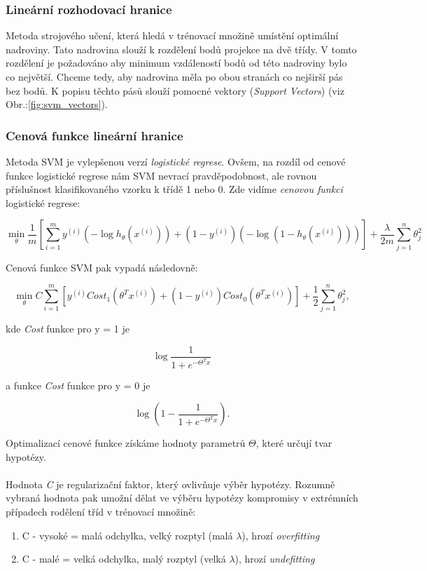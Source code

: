 \documentclass[a4]{article}
\begin{document}
\subsubsection{Lineární rozhodovací hranice}
Metoda strojového učení, která hledá v trénovací množině umístění optimální nadroviny. Tato nadrovina slouží k rozdělení bodů projekce na dvě třídy. V tomto rozdělení je požadováno aby minimum vzdáleností bodů od této nadroviny bylo co největší. Chceme tedy, aby nadrovina měla po obou stranách co nejširší pás bez bodů. K popisu těchto pásů slouží pomocné vektory (\textit{Support Vectors}) (viz Obr.:\ref{fig:svm_vectors}).
\cite{svm_zcu}

\subsubsection{Cenová funkce lineární hranice}
Metoda SVM je vylepšenou verzí \textit{logistické regrese}. Ovšem, na rozdíl od cenové funkce logistické regrese nám SVM nevrací pravděpodobnost, ale rovnou příslušnost klasifikovaného vzorku k třídě 1 nebo 0. Zde vidíme \textit{cenovou funkci} logistické regrese:

$$\min_{\theta} \frac{1}{m}[\sum_{i=1}^{m}y^{(i)}(-\log h_{\theta}(x^{(i)}))+(1-y^{(i)})(-\log(1-h_{\theta}(x^{(i)})))]+\frac{\lambda}{2m}\sum_{j=1}^{n}\theta_{j}^{2}$$

Cenová funkce SVM pak vypadá následovně:

$$\min_{\theta} C \sum_{i=1}^{m}[y^{(i)} Cost_1 (\theta^T x^{(i)})+(1-y^{(i)}) Cost_0 (\theta^T x^{(i)})] + \frac{1}{2} \sum_{j=1}^{n}\theta_{j}^{2},$$

kde \textit{Cost} funkce pro y = 1 je

$$\log\frac{1}{1 + e^{-\Theta^{T}x}}$$

a funkce \textit{Cost} funkce pro y = 0 je

$$\log(1-\frac{1}{1 + e^{-\Theta^{T}x}}).$$

Optimalizací cenové funkce získáme hodnoty parametrů $\Theta$, které určují tvar hypotézy.
\\\\
Hodnota \textit{C} je regularizační faktor, který ovlivňuje výběr hypotézy. Rozumně vybraná hodnota pak umožní dělat ve výběru hypotézy kompromisy v extrémních případech rodělení tříd v trénovací množině:

\begin{enumerate}
	\item C - vysoké = malá odchylka, velký rozptyl (malá $\lambda$), hrozí \textit{overfitting}
	\item C - malé = velká odchylka, malý rozptyl (velká $\lambda$), hrozí \textit{undefitting}
\end{enumerate}
\end{document}
